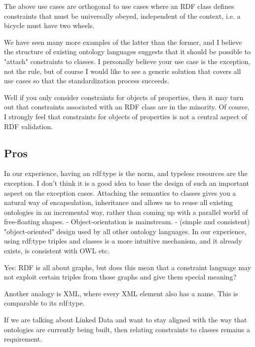 \documentclass{llncs}
\begin{document}
The above use cases are orthogonal to use cases where an RDF class defines
constraints that must be universally obeyed, independent of the context,
i.e. a bicycle must have two wheels.

We have seen many more examples of the
latter than the former, and I believe the structure of existing ontology
languages suggests that it should be possible to "attach" constraints to
classes. I personally believe your use case is the exception, not the
rule, but of course I would like to see a generic solution that covers
all use cases so that the standardization process succeeds.


Well if you only consider constraints for objects of properties, 
then it may turn out that constraints associated with an RDF class
are in the minority.  Of course, I strongly feel that constraints for objects
of properties is not a central aspect of RDF validation.

\subsection{Pros}

In our experience, having an rdf:type is the norm, and typeless resources are 
the exception. I don't think it is a good idea to base the design of 
such an important aspect on the exception cases. Attaching 
the semantics to classes gives you a natural way of encapsulation, 
inheritance and allows us to reuse all existing ontologies in an 
incremental way, rather than coming up with a parallel world of 
free-floating shapes.
- Object-orientation is mainstream.
- (simple and consistent) "object-oriented" design used by all other ontology languages.
In our experience, using rdf:type triples and classes is a more intuitive mechanism, and it 
already exists, is consistent with OWL etc.

Yes: RDF is all about graphs, but does 
this mean that a constraint language may not exploit certain triples 
from those graphs and give them special meaning?

Another analogy is XML, where every XML element also has a name. This is 
comparable to its rdf:type.

If we are talking about Linked Data and want to stay
aligned with the way that ontologies are currently being built, then
relating constraints to classes remains a requirement.
\end{document}
